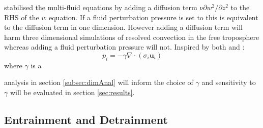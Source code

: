 \documentclass[draft]{agujournal2019}
\begin{document}
\subsubsection{}

 stabilised the multi-fluid equations by adding a diffusion
term $\nu\partial w^{2}/\partial z^{2}$ to the RHS of the $w$ equation.
If a fluid perturbation pressure is set to 
 this is equivalent to the diffusion term in one dimension. However
adding a diffusion term will harm three dimensional simulations of
resolved convection in the free troposphere whereas adding a fluid
perturbation pressure will not. Inspired by both  and
:
\begin{equation}
p_{i}=-\gamma\nabla\cdot(\sigma_i \mathbf{u}_{i})
\label{eq:Pi_div}
\end{equation}
where $\gamma$ is a 

 analysis in section
\ref{subsec:dimAnal} will inform the choice of $\gamma$ and sensitivity
to $\gamma$ will be evaluated in section \ref{sec:results}.

\subsection{Entrainment and Detrainment \label{subsec:Sij}}
\end{document}
